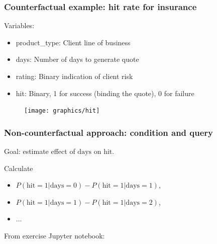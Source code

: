 \begin{frame}
    \frametitle{Counterfactual example: hit rate for insurance}
    Variables:
    \begin{itemize}
    \item product\_type: Client line of business
    \item days: Number of days to generate quote
    \item rating: Binary indication of client risk
    \item hit: Binary, 1 for success (binding the quote), 0 for failure\newline
    \end{itemize}
    
    \begin{figure}[ht]
    \texttt{[image: graphics/hit]}
    \end{figure}
\end{frame}



\begin{frame}
\frametitle{Non-counterfactual approach: condition and query}

Goal: estimate effect of $\textrm{days}$ on $\textrm{hit}$.\newline

Calculate
\begin{itemize}
\item $P(\textrm{hit}=1 | \textrm{days} = 0) - P(\textrm{hit}=1 | \textrm{days} = 1)$,
\item $P(\textrm{hit}=1 | \textrm{days} = 1) - P(\textrm{hit}=1 | \textrm{days} = 2)$,
\item $\ldots$ \newline
\end{itemize}

From exercise Jupyter notebook:\newline

\end{frame}


